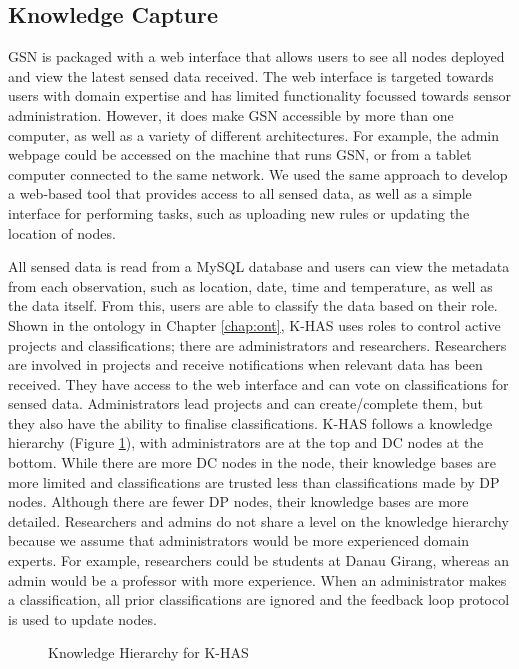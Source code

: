 	\subsection{Knowledge Capture}\label{arch:kc}
		GSN is packaged with a web interface that allows users to see all nodes deployed and view the latest sensed data received. The web interface is targeted towards users with domain expertise and has limited functionality focussed towards sensor administration. However, it does make GSN accessible by more than one computer, as well as a variety of different architectures. For example, the admin webpage could be accessed on the machine that runs GSN, or from a tablet computer connected to the same network. We used the same approach to develop a web-based tool that provides access to all sensed data, as well as a simple interface for performing tasks, such as uploading new rules or updating the location of nodes.
		
		All sensed data is read from a MySQL database and users can view the metadata from each observation, such as location, date, time and temperature, as well as the data itself. From this, users are able to classify the data based on their role. Shown in the ontology in Chapter \ref{chap:ont}, K-HAS uses roles to control active projects and classifications; there are administrators and researchers. Researchers are involved in projects and receive notifications when relevant data has been received. They have access to the web interface and can vote on classifications for sensed data. Administrators lead projects and can create/complete them, but they also have the ability to finalise classifications. K-HAS follows a knowledge hierarchy (Figure \ref{arch:kno:hier}), with administrators are at the top and DC nodes at the bottom. While there are more DC nodes in the node, their knowledge bases are more limited and classifications are trusted less than classifications made by DP nodes. Although there are fewer DP nodes, their knowledge bases are more detailed. Researchers and admins do not share a level on the knowledge hierarchy because we assume that administrators would be more experienced domain experts. For example, researchers could be students at Danau Girang, whereas an admin would be a professor with more experience. When an administrator makes a classification, all prior classifications are ignored and the feedback loop protocol is used to update nodes.

		\begin{figure}[!h]
			\centering
			\caption{Knowledge Hierarchy for K-HAS}
			\label{arch:kno:hier}
		\end{figure}
		
